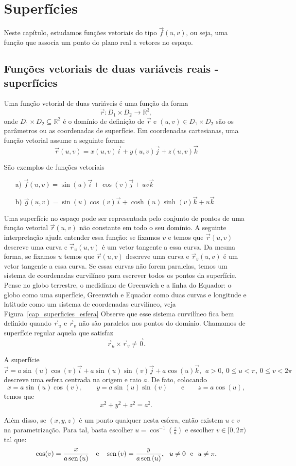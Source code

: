\chapter{Superfícies}
  Neste capítulo, estudamos funções vetoriais do tipo $\vec{f}(u,v)$, ou seja, uma função que associa um ponto do plano real a vetores no espaço. 
\section{Funções vetoriais de duas variáveis reais - superfícies}
Uma função vetorial de duas variáveis é uma função da forma $$\vec{r}:D_1\times D_2 \to \mathbb{R}^3,$$ onde $D_1\times D_2\subseteq \mathbb{R}^2$ é o domínio de definição de $\vec{r}$ e $(u,v)\in D_1\times D_2$ são os parâmetros ou as coordenadas de superfície. Em coordenadas cartesianas, uma função vetorial assume a seguinte forma:
$$\vec{r}(u,v)=x(u,v)\vec{i}+y(u,v)\vec{j}+z(u,v)\vec{k}$$
\begin{ex}\label{exfv1} São exemplos de funções vetoriais
\begin{itemize}
\item [a)] $\vec{f}(u,v)=\sin(u)\vec{i}+\cos(v)\vec{j}+uv\vec{k}$
\item [b)] $\vec{g}(u,v)=\sin(u)\cos(v) \vec{i}+\cosh(u)\sinh(v)\vec{k}+u\vec{k}$
\end{itemize}
\end{ex} 
Uma superfície no espaço pode ser representada pelo conjunto de pontos de uma função vetorial $\vec{r}(u,v)$ não constante em todo o seu domínio. A seguinte interpretação ajuda entender essa função: se fixamos $v$ e temos que $\vec{r}(u,v)$ descreve uma curva e $\vec{r}_u(u,v)$ é um vetor tangente a essa curva. Da mesma forma, se fixamos $u$ temos que $\vec{r}(u,v)$ descreve uma curva e $\vec{r}_v(u,v)$ é um vetor tangente a essa curva. Se essas curvas não forem paralelas, temos um sistema de coordenadas curvilíneo para escrever todos os pontos da superfície. Pense no globo terrestre, o medidiano de Greenwich e a linha do Equador: o globo como uma superfície, Greenwich e Equador como duas curvas e longitude e latitude como um sistema de coordenadas curvilíneo, veja Figura~\ref{cap_superficies_esfera} Observe que esse sistema curvilíneo fica bem definido quando $\vec{r}_u$ e $\vec{r}_v$ não são paralelos nos pontos do domínio. Chamamos de superfície regular aquela que satisfaz
$$
\vec{r}_u\times \vec{r}_v\neq \vec{0}.
$$
\begin{ex}A superfície
$$
\vec{r}=a\sin(u)\cos(v)\vec{i}+a\sin(u)\sin(v)\vec{j}+a\cos(u)\vec{k},~~ a>0, ~ 0\leq u< \pi, ~ 0\leq v< 2\pi
$$
descreve uma esfera centrada na origem e raio $a$. De fato, colocando $$x=a\sin(u)\cos(v),\qquad y=a\sin(u)\sin(v)\qquad\text{e}\qquad z=a\cos(u),$$
temos que
$$
x^2+y^2+z^2=a^2.
$$
\end{ex}
Além disso, se $(x,y,z)$ é um ponto qualquer nesta esfera, então existem $u$ e $v$ na parametrização. Para tal, basta escolher $u=\cos^{-1}\left(\frac{z}{a}\right)$ e escolher $v\in[0,2\pi)$ tal que:
$$\cos(v)=\frac{x}{a\sin(u)} \quad \hbox{e} \quad \sin(v)=\frac{y}{a\sin(u)},~~u\neq 0 ~~ \hbox{e} ~~u\neq \pi.$$

